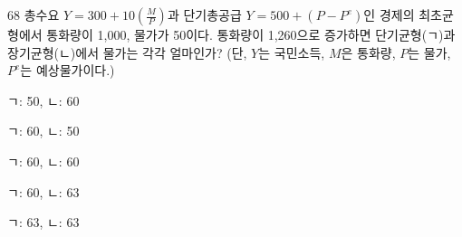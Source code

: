 \begin{question}{68}
총수요 $Y=300+10( \frac{ M } { P } )$과 단기총공급 $Y=500+(P-P^{ e } )$인 경제의 최초균형에서 통화량이 1,000, 물가가 50이다. 통화량이 1,260으로 증가하면 단기균형(ㄱ)과 장기균형(ㄴ)에서 물가는 각각 얼마인가? (단, $Y$는 국민소득, $M$은 통화량, $P$는 물가, $P^{ e }$는 예상물가이다.)
\begin{choices}
  \item ㄱ: 50, ㄴ: 60
  \item ㄱ: 60, ㄴ: 50
  \item ㄱ: 60, ㄴ: 60
  \item ㄱ: 60, ㄴ: 63
  \item ㄱ: 63, ㄴ: 63
\end{choices}
\end{question}
